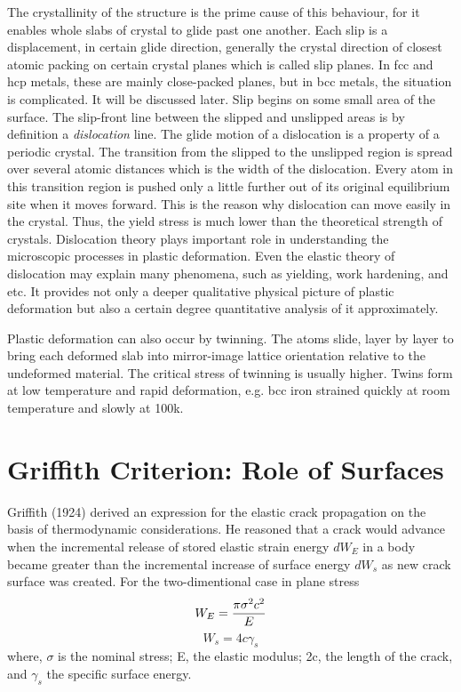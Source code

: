 The crystallinity of the structure is the prime cause of this 
behaviour, for it enables whole slabs of crystal to glide past one 
another. Each slip is a displacement, in certain glide direction, 
generally the crystal direction of closest atomic packing on certain 
crystal planes which is called slip planes. In fcc and hcp metals, 
these are mainly close-packed planes, but in bcc metals, the 
situation is complicated. It will be discussed later. Slip begins on 
some small area of the surface. The slip-front line between the 
slipped and unslipped areas is by definition a {\em dislocation} line. 
The glide motion of a dislocation is a property of a periodic crystal. 
The transition from the slipped to the unslipped region is spread over 
several atomic distances which is the width of the dislocation. Every 
atom in this transition region is pushed only a little further out of 
its original equilibrium site when it moves forward. This is the 
reason why dislocation can move easily in the crystal. Thus, the yield 
stress is much lower than the theoretical strength of crystals. 
Dislocation theory plays important role in understanding the 
microscopic processes in plastic deformation. Even the elastic theory 
of dislocation may explain many phenomena, such as yielding, work 
hardening, and etc. It provides not only a deeper qualitative physical 
picture of plastic deformation but also a certain degree quantitative 
analysis of it approximately.

Plastic deformation can also occur by twinning. The atoms slide, 
layer by layer to bring each deformed slab into mirror-image lattice 
orientation relative to the undeformed material. The critical stress 
of twinning is usually higher. Twins form at low temperature and 
rapid deformation, e.g. bcc iron strained quickly at room temperature 
and slowly at 100k.

\section{Griffith Criterion: Role of Surfaces} %
Griffith (1924) derived an expression for the elastic crack 
propagation on the basis of thermodynamic considerations. He reasoned 
that a crack would advance when the incremental release of stored 
elastic strain energy $dW_E$ in a body became greater than the 
incremental increase of surface energy $dW_s$ as new crack surface 
was created. For the two-dimentional case in plane stress
\begin{equation}
{W_E} = {{\pi \sigma^2 c^2} \over E}
\end{equation}
$$ {W_s} = 4c \gamma_s $$
where, $\sigma$ is the nominal stress; E, the elastic modulus; 2c, the 
length of the crack, and $\gamma_s$ the specific surface energy.

